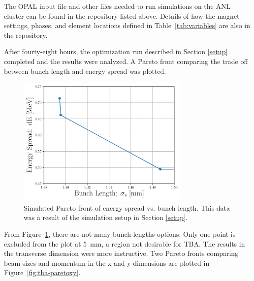 The OPAL input file and other files needed to run simulations on the ANL cluster 
can be found in the repository listed above.
Details of how the magnet settings, phases, and element locations defined 
in Table~\ref{tab:variables} are also in the repository.


After fourty-eight hours, the optimization run described in Section \ref{setup}
completed and the results were analyzed. 
A Pareto front comparing the trade off between bunch length and energy spread was plotted.  
\begin{figure}
	\centering
	\includegraphics[width=0.75\textwidth]{./images/dE_vs_zrms_pareto_front_quads_before_Q5}
	\caption{Simulated Pareto front of energy spread vs. bunch length.
	This data was a result of the simulation setup in Section \ref{setup}.}
\label{fig:tba-pareto}
\end{figure}
From Figure~\ref{fig:tba-pareto}, there are not many bunch lengths options.
Only one point is excluded from the plot at \SI{5}{mm}, a region 
not desirable for TBA. The results in the transverse dimension were
more instructive. Two Pareto fronts comparing beam sizes
and momentum in the x and y dimensions are plotted in Figure~\ref{fig:tba-paretoxy}.
